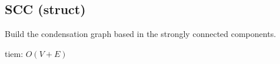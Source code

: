 \subsection{SCC (struct)}

Build the condensation graph based in the strongly connected components.

tiem: $O(V + E)$

